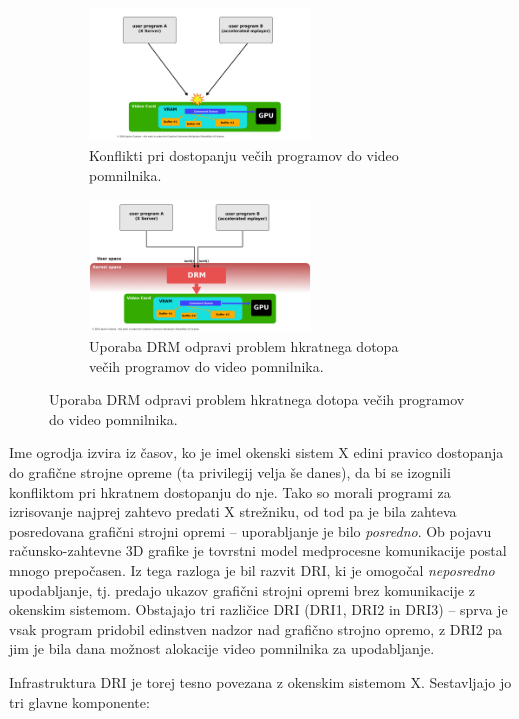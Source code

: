 \documentclass{article}
\begin{document}
\begin{figure}[H]
    \centering
    \begin{subfigure}{.49\linewidth}
        \centering
        \includegraphics[height=100pt]{Access_to_video_card_without_DRM.png}
        \caption{Konflikti pri dostopanju večih programov do video pomnilnika. \autocite{fig:konflikti}}
    \end{subfigure}
    \begin{subfigure}{.49\linewidth}
        \centering
        \includegraphics[height=100pt]{Access_to_video_card_with_DRM.png}
        \caption{Uporaba DRM odpravi problem hkratnega dotopa večih programov do video pomnilnika. \autocite{fig:nekonflikti}}
    \end{subfigure}
\end{figure}

Ime ogrodja izvira iz časov, ko je imel okenski sistem X edini pravico dostopanja do grafične strojne opreme (ta privilegij velja še danes), da bi se izognili konfliktom pri hkratnem dostopanju do nje. Tako so morali programi za izrisovanje najprej zahtevo predati X strežniku, od tod pa je bila zahteva posredovana grafični strojni opremi -- uporabljanje je bilo \textit{posredno}. Ob pojavu računsko-zahtevne 3D grafike je tovrstni model medprocesne komunikacije postal mnogo prepočasen. Iz tega razloga je bil razvit DRI, ki je omogočal \textit{neposredno} upodabljanje, tj. predajo ukazov grafični strojni opremi brez komunikacije z okenskim sistemom. Obstajajo tri različice DRI (DRI1, DRI2 in DRI3) -- sprva je vsak program pridobil edinstven nadzor nad grafično strojno opremo, z DRI2 pa jim je bila dana možnost alokacije video pomnilnika za upodabljanje. \autocite{dri}

Infrastruktura DRI je torej tesno povezana z okenskim sistemom X. Sestavljajo jo tri glavne komponente:
\end{document}
